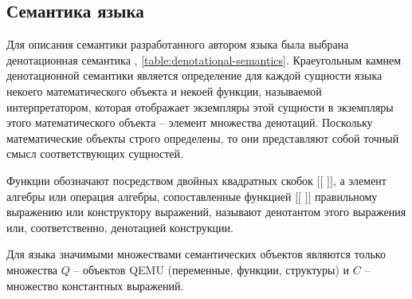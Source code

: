 \subsection{Семантика языка}\label{sec:ch2/sec2/sub3}

Для описания семантики разработанного автором языка была выбрана денотационная семантика \cite{denotational-semantics},
\cref{table:denotational-semantics}.
Краеугольным камнем денотационной семантики является определение для каждой сущности
языка некоего математического объекта и некоей функции, называемой интерпретатором,
которая отображает экземпляры этой сущности в экземпляры этого математического объекта -- элемент множества денотаций.
Поскольку математические объекты строго определены, то они представляют собой точный
смысл соответствующих сущностей.

Функции обозначают посредством двойных квадратных скобок $[[$ $]]$,
а элемент алгебры или операция алгебры, сопоставленные функцией $[[$ $]]$
правильному выражению или конструктору выражений, называют денотантом этого выражения или,
соответственно, денотацией конструкции. \cite{denotational-semantics}

Для языка {\mylanguage} значимыми множествами семантических объектов
являются только множества $Q$ -- объектов QEMU (переменные, функции, структуры) и
$C$ -- множество константных выражений.


